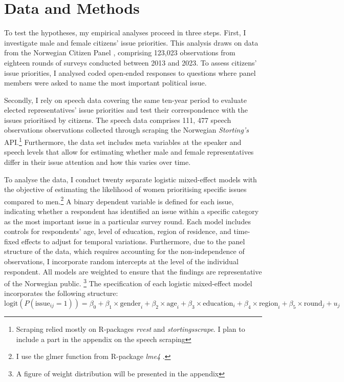 
\section*{Data and Methods}
To test the hypotheses, my empirical analyses proceed in three steps. First, I investigate male and female citizens' issue priorities. This analysis draws on data from the Norwegian Citizen Panel \parencite{ivarsflaten_norwegian_2024}, comprising 123,023 observations from eighteen rounds of surveys conducted between 2013 and 2023. To assess citizens' issue priorities, I analysed coded open-ended responses to questions where panel members were asked to name the most important political issue.

Secondly, I rely on speech data covering the same ten-year period to evaluate elected representatives' issue priorities and test their correspondence with the issues prioritised by citizens. The speech data comprises 111, 477 speech observations observations collected through scraping the Norwegian \textit{Storting's} API.\footnote{Scraping relied mostly on R-packages \textit{rvest} and \textit{stortingsscrape}. \color{red}I plan to include a part in the appendix on the speech scraping} Furthermore, the data set includes meta variables at the speaker and speech levels that allow for estimating whether male and female representatives differ in their issue attention and how this varies over time. %

To analyse the data, I conduct twenty separate logistic mixed-effect models with the objective of estimating the likelihood of women prioritising specific issues compared to men.\footnote{I use the glmer function from R-package \textit{lme4} \parencite{bates_lme4_2023}.} A binary dependent variable is defined for each issue, indicating whether a respondent has identified an issue within a specific category as the most important issue in a particular survey round. Each model includes controls for respondents' age, level of education, region of residence, and time-fixed effects to adjust for temporal variations. Furthermore, due to the panel structure of the data, which requires accounting for the non-independence of observations, I incorporate random intercepts at the level of the individual respondent. All models are weighted to ensure that the findings are representative of the Norwegian public. \footnote{\color{red} A figure of weight distribution will be presented in the appendix }   The specification of each logistic mixed-effect model incorporates the following structure:
\begin{equation}
\text{logit}(P(\text{issue}_{ij} = 1)) = \beta_0 + \beta_1 \times \text{gender}_i + \beta_2 \times \text{age}_i + \beta_3 \times \text{education}_i + \beta_4 \times \text{region}_i + \beta_5 \times \text{round}_j + u_j
\end{equation}

